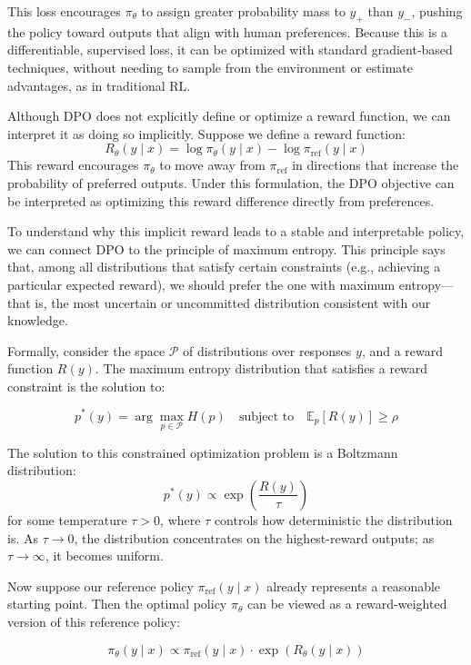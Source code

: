 \documentclass[
  letterpaper,
  numbers=noenddot,
  DIV=11]{scrreprt}
\theoremstyle{plain}
\theoremstyle{definition}
\theoremstyle{remark}
\begin{document}
This loss encourages \(\pi_\theta\) to assign greater probability mass
to \(y_+\) than \(y_-\), pushing the policy toward outputs that align
with human preferences. Because this is a differentiable, supervised
loss, it can be optimized with standard gradient-based techniques,
without needing to sample from the environment or estimate advantages,
as in traditional RL.

Although DPO does not explicitly define or optimize a reward function,
we can interpret it as doing so implicitly. Suppose we define a reward
function: \[
R_\theta(y \mid x) = \log \pi_\theta(y \mid x) - \log \pi_{\text{ref}}(y \mid x)
\] This reward encourages \(\pi_\theta\) to move away from
\(\pi_{\text{ref}}\) in directions that increase the probability of
preferred outputs. Under this formulation, the DPO objective can be
interpreted as optimizing this reward difference directly from
preferences.

To understand why this implicit reward leads to a stable and
interpretable policy, we can connect DPO to the principle of maximum
entropy. This principle says that, among all distributions that satisfy
certain constraints (e.g., achieving a particular expected reward), we
should prefer the one with maximum entropy---that is, the most uncertain
or uncommitted distribution consistent with our knowledge.

Formally, consider the space \(\mathcal{P}\) of distributions over
responses \(y\), and a reward function \(R(y)\). The maximum entropy
distribution that satisfies a reward constraint is the solution to:

\[
p^*(y) = \arg\max_{p \in \mathcal{P}} H(p) \quad \text{subject to} \quad \mathbb{E}_p[R(y)] \geq \rho
\]

The solution to this constrained optimization problem is a Boltzmann
distribution: \[
p^*(y) \propto \exp\left(\frac{R(y)}{\tau}\right)
\] for some temperature \(\tau > 0\), where \(\tau\) controls how
deterministic the distribution is. As \(\tau \to 0\), the distribution
concentrates on the highest-reward outputs; as \(\tau \to \infty\), it
becomes uniform.

Now suppose our reference policy \(\pi_{\text{ref}}(y \mid x)\) already
represents a reasonable starting point. Then the optimal policy
\(\pi_\theta\) can be viewed as a reward-weighted version of this
reference policy:

\[
\pi_\theta(y \mid x) \propto \pi_{\text{ref}}(y \mid x) \cdot \exp\left(R_\theta(y \mid x)\right)
\]
\end{document}
